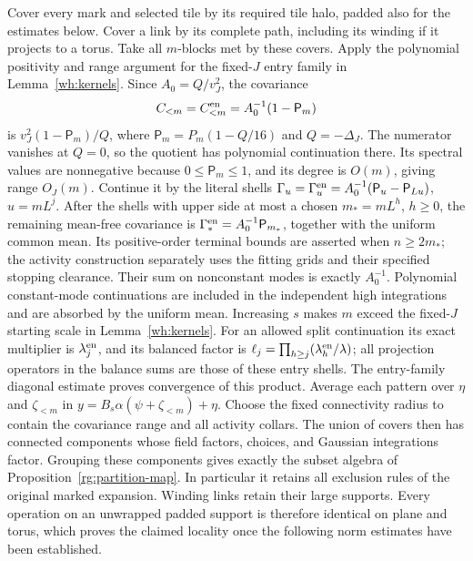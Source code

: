 Cover every mark and selected tile by its required tile halo, padded
also for the estimates below.  Cover a link by its complete path,
including its winding if it projects to a torus.  Take all $m$-blocks
met by these covers.  Apply the polynomial positivity and range argument
for the fixed-$J$ entry family in Lemma~\ref{wh:kernels}.
Since $A_0=Q/v_J^2$, the covariance
\begin{equation}\label{en:entry-covariance}
 C_{<m}=C^{\rm en}_{<m}=A_0^{-1}(1-\mathsf P_m)
\end{equation}
is $v_J^2(1-\mathsf P_m)/Q$, where
$\mathsf P_m=P_m(1-Q/16)$ and $Q=-\Delta_J$.  The numerator vanishes
at $Q=0$, so the quotient has
polynomial continuation there.  Its spectral values are nonnegative
because $0\leq\mathsf P_m\leq1$, and its degree is $O(m)$, giving range
$O_J(m)$.  Continue it by the literal shells
$\Gamma_u=\Gamma_u^{\rm en}=A_0^{-1}(\mathsf P_u-\mathsf P_{Lu})$,
$u=mL^j$.  After the shells with upper side at most a chosen
$m_*=mL^h$, $h\ge0$, the remaining mean-free covariance is
$\Gamma_*^{\rm en}=A_0^{-1}\mathsf P_{m_*}$, together with the
uniform common mean.  Its positive-order terminal bounds are asserted
when $n\ge2m_*$; the activity construction separately uses the fitting
grids and their specified stopping clearance.
Their sum on nonconstant modes is exactly $A_0^{-1}$.
Polynomial constant-mode continuations are included in the independent
high integrations and are absorbed by the uniform mean.
Increasing $s$ makes $m$ exceed the fixed-$J$ starting scale in
Lemma~\ref{wh:kernels}.  For an allowed split continuation its exact multiplier is
$\lambda_j^{\rm en}$, and its balanced factor is
$\ell_j=\prod_{h\ge j}(\lambda_h^{\rm en}/\lambda)$; all projection
operators in the balance sums are those of these entry shells.
The entry-family diagonal estimate proves convergence of this product.
Average each pattern over
$\eta$ and $\zeta_{<m}$ in
$y=B_s\alpha(\psi+\zeta_{<m})+\eta$.
Choose the fixed connectivity radius to contain the covariance range
and all activity collars.  The union of covers then has connected
components whose field factors, choices, and Gaussian integrations
factor.  Grouping these components gives exactly the subset algebra
of Proposition~\ref{rg:partition-map}.  In particular it retains all exclusion
rules of the original marked expansion.  Winding links retain their
large supports.  Every operation on an unwrapped padded support is
therefore identical on plane and torus, which proves the claimed
locality once the following norm estimates have been established.

